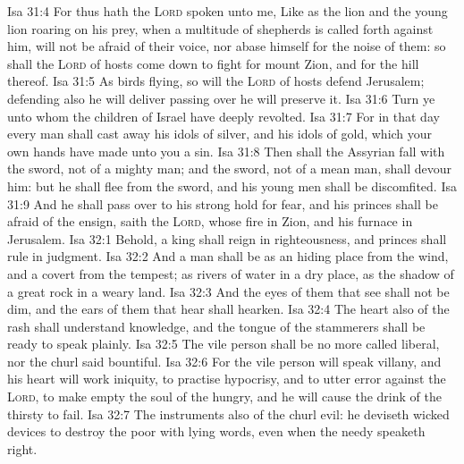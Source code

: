 \vs Isa 31:4 For thus hath the \textsc{Lord} spoken unto me, Like as the lion and the young lion roaring on his prey, when a multitude of shepherds is called forth against him,  will not be afraid of their voice, nor abase himself for the noise of them: so shall the \textsc{Lord} of hosts come down to fight for mount Zion, and for the hill thereof.
\vs Isa 31:5 As birds flying, so will the \textsc{Lord} of hosts defend Jerusalem; defending also he will deliver  passing over he will preserve it.
\vs Isa 31:6 Turn ye unto  whom the children of Israel have deeply revolted.
\vs Isa 31:7 For in that day every man shall cast away his idols of silver, and his idols of gold, which your own hands have made unto you  a sin.
\vs Isa 31:8 Then shall the Assyrian fall with the sword, not of a mighty man; and the sword, not of a mean man, shall devour him: but he shall flee from the sword, and his young men shall be discomfited.
\vs Isa 31:9 And he shall pass over to his strong hold for fear, and his princes shall be afraid of the ensign, saith the \textsc{Lord}, whose fire  in Zion, and his furnace in Jerusalem.
\vs Isa 32:1 Behold, a king shall reign in righteousness, and princes shall rule in judgment.
\vs Isa 32:2 And a man shall be as an hiding place from the wind, and a covert from the tempest; as rivers of water in a dry place, as the shadow of a great rock in a weary land.
\vs Isa 32:3 And the eyes of them that see shall not be dim, and the ears of them that hear shall hearken.
\vs Isa 32:4 The heart also of the rash shall understand knowledge, and the tongue of the stammerers shall be ready to speak plainly.
\vs Isa 32:5 The vile person shall be no more called liberal, nor the churl said  bountiful.
\vs Isa 32:6 For the vile person will speak villany, and his heart will work iniquity, to practise hypocrisy, and to utter error against the \textsc{Lord}, to make empty the soul of the hungry, and he will cause the drink of the thirsty to fail.
\vs Isa 32:7 The instruments also of the churl  evil: he deviseth wicked devices to destroy the poor with lying words, even when the needy speaketh right.
